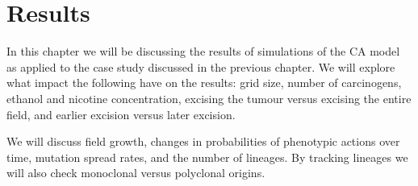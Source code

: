\documentclass[\main/thesis.tex]{subfiles}
\begin{document}
\chapter{Results}

In this chapter we will be discussing the results of simulations of the CA model as applied to the case study discussed in the previous chapter. We will explore what impact the following have on the results: grid size, 
number of carcinogens, ethanol and nicotine concentration, excising the tumour versus excising the entire field, and earlier excision versus later excision. 

We will discuss field growth, changes in probabilities of phenotypic actions over time, mutation spread rates, and the number of lineages. By tracking lineages we will also check monoclonal versus polyclonal origins.
\end{document}
